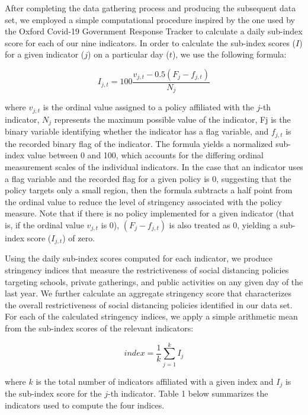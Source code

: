 After completing the data gathering process and producing the subsequent data set, we employed a simple computational procedure inspired by the one used by the Oxford Covid-19 Government Response Tracker to calculate a daily sub-index score for each of our nine indicators. In order to calculate the sub-index scores ($I$) for a given indicator ($j$) on a particular day ($t$), we use the following formula:

\begin{equation*}
  I_{j,t} = 100\frac{v_{j,t} - 0.5\left(F_j - f_{j,t}\right)}{N_j}
\end{equation*}

where $v_{j,t}$ is the ordinal value assigned to a policy affiliated with the $j$-th indicator, $N_j$ represents the maximum possible value of the indicator, Fj is the binary variable identifying whether the indicator has a flag variable, and $f_{j,t}$ is the recorded binary flag of the indicator. The formula yields a normalized sub-index value between 0 and 100, which accounts for the differing ordinal measurement scales of the individual indicators. In the case that an indicator uses a flag variable and the recorded flag for a given policy is 0, suggesting that the policy targets only a small region, then the formula subtracts a half point from the ordinal value to reduce the level of stringency associated with the policy measure. Note that if there is no policy implemented for a given indicator (that is, if the ordinal value $v_{j,t}$ is 0),   $\left(F_{j} - f_{j,t}\right)$ is also treated as 0, yielding a sub-index score ($I_{j,t}$) of zero.

Using the daily sub-index scores computed for each indicator, we produce stringency indices that measure the restrictiveness of social distancing policies targeting schools, private gatherings, and public activities on any given day of the last year. We further calculate an aggregate stringency score that characterizes the overall restrictiveness of social distancing policies identified in our data set. For each of the calculated stringency indices, we apply a simple arithmetic mean from the sub-index scores of the relevant indicators:

\begin{equation*}
  \text{$index$} = \frac{1}{k} \sum_{j=1}^{k}I_j
\end{equation*}

where $k$ is the total number of indicators affiliated with a given index and $I_{j}$ is the sub-index score for the $j$-th indicator. Table 1 below summarizes the indicators used to compute the four indices.


